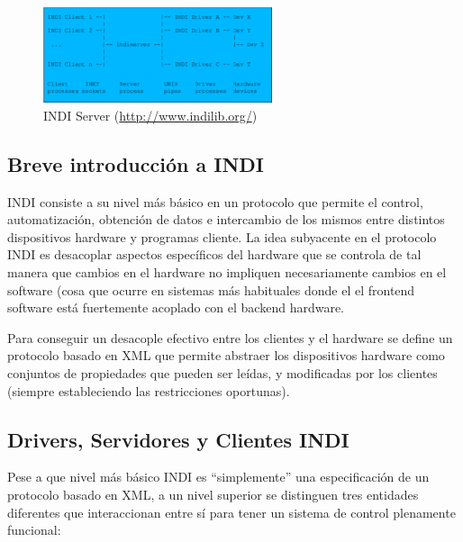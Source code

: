 \bigskip
\begin{figure}[!ht]
  \begin{center}
    \includegraphics[width=0.6\textwidth]{../images/Indi_server.png}
    \caption{INDI Server (\href{http://www.indilib.org/}{http://www.indilib.org/})}
    \label{fig:indi_server}
  \end{center}
\end{figure}

\bigskip

\subsection{Breve introducción a INDI}

INDI consiste a su nivel más básico en un protocolo que permite el control, automatización, obtención de datos e intercambio de los mismos entre distintos dispositivos hardware y programas cliente. La idea subyacente en el protocolo INDI es desacoplar aspectos específicos del hardware que se controla de tal manera que cambios en el hardware no impliquen necesariamente cambios en el software (cosa que ocurre en sistemas más habituales donde el el frontend software está fuertemente acoplado con el backend hardware.

\bigskip
Para conseguir un desacople efectivo entre los clientes y el hardware se define un protocolo basado en XML que permite abstraer los dispositivos hardware como conjuntos de propiedades que pueden ser leídas, y modificadas por los clientes (siempre estableciendo las restricciones oportunas).


\subsection{Drivers, Servidores y Clientes INDI}

Pese a que nivel más básico INDI es ``simplemente'' una especificación de un protocolo basado en XML, a un nivel superior se distinguen tres entidades diferentes que interaccionan entre sí para tener un sistema de control plenamente funcional:

